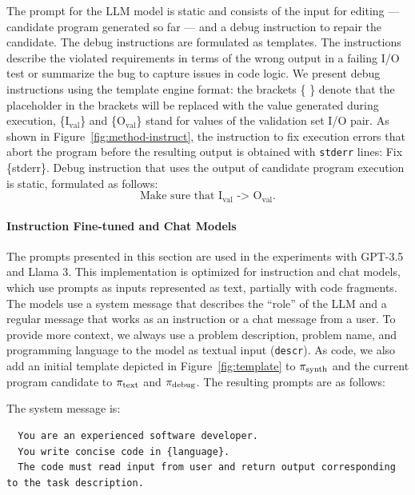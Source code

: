 The prompt for the LLM model is static and consists of the input for editing --- candidate program generated so far --- and a debug instruction to repair the candidate. 
The debug instructions are formulated as templates. The instructions describe the violated requirements in terms of the wrong output in a failing I/O test or summarize the bug to capture issues in code logic.
We present debug instructions using the template engine format: the brackets \{ \} denote that the placeholder in the brackets will be replaced with the value generated during execution, \{I$_{\text{val}}$\} and \{O$_{\text{val}}$\} stand for values of the validation set I/O pair. As shown in Figure~\ref{fig:method-instruct}, the instruction to fix execution errors that abort the program before the resulting output is obtained with \texttt{stderr} lines: Fix \{stderr\}. Debug instruction that uses the output of candidate program execution is static, formulated as follows: 
\begin{equation}\label{seidr:prompt-0} 
    \text{Make sure that I}_{\text{val}} \text{ -> O}_{\text{val}}. \tag{S0}
\end{equation}


\paragraph{Instruction Fine-tuned and Chat Models}
\label{sec:seidr-ollama-prompts}

The prompts presented in this section are used in the experiments with GPT-3.5 and Llama 3.
This implementation is optimized for instruction and chat models, which use prompts as inputs represented as text, partially with code fragments.
The models use a system message that describes the ``role'' of the LLM and a regular message that works as an instruction or a chat message from a user.
To provide more context, we always use a problem description, problem name, and programming language to the model as textual input (\texttt{descr}). 
As code, we also add an initial template depicted in Figure~\ref{fig:template} to $ \pi_\text{synth} $ and the current program candidate to $ \pi_\text{text} $ and $ \pi_\text{debug} $. The resulting prompts are as follows:

\newpage
The system message is: 
\begin{lstlisting}
  You are an experienced software developer.
  You write concise code in {language}.
  The code must read input from user and return output corresponding to the task description.
\end{lstlisting}

